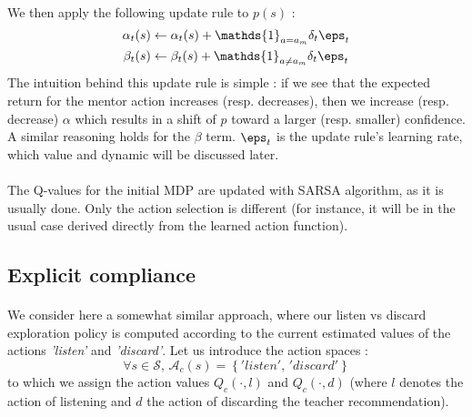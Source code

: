 \documentclass[a4paper]{report}
\begin{document}
{{{{			\paragraph{} We then apply the following update rule to $p(s)$ : 
			\begin{equation}
				\label{eq::update_rule}
				\begin{aligned}
					\alpha_t(s) &\leftarrow \alpha_t(s) +  \mathds{1}_{a=a_m}\delta_t \eps_t\\
					\beta_t(s) &\leftarrow \beta_t(s) +   \mathds{1}_{a\neq a_m}\delta_t \eps_t
				\end{aligned}
			\end{equation}
			The intuition behind this update rule is simple : if we see that the expected return for the mentor action increases (resp. decreases), then we increase (resp. decrease) $\alpha$ which results in a shift of $p$ toward a larger (resp. smaller) confidence. A similar reasoning holds for the $\beta$ term.  $\eps_t$ is the update rule's learning rate, which value and dynamic will be discussed later. 
		
			\paragraph{} The Q-values for the initial MDP are updated with SARSA algorithm, as it is usually done. Only the action selection is different (for instance, it will be in the usual case derived directly from the learned action function). 
		}
	
		\subsection{Explicit compliance}
		{
			\paragraph{} We consider here a somewhat similar approach, where our listen vs discard exploration policy is computed according to the current estimated values of the actions \emph{'listen'} and \emph{'discard'}. Let us introduce the action spaces : 
			\begin{equation}
				\forall s\in\mathcal{S}, \, \mathcal{A}_c(s) = \left\{ 'listen', \, 'discard'\right\}
			\end{equation}
			to which we assign the action values $Q_c(\cdot,l)$ and  $Q_c(\cdot,d)$ (where $l$ denotes the action of listening and $d$ the action of discarding the teacher recommendation). 
			
}}}}
\end{document}
